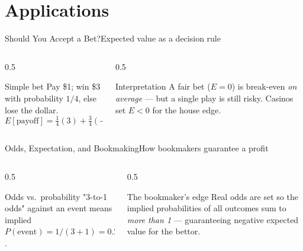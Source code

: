 \documentclass[aspectratio=169,11pt]{beamer}
\begin{document}
\section{Applications}

\begin{frame}{Should You Accept a Bet?}{Expected value as a decision rule}
  \begin{columns}[T]
    \begin{column}{0.5\textwidth}
      \begin{block}{Simple bet}
        \small Pay \$1; win \$3 with probability $1/4$, else lose the
        dollar.
        \[ E[\text{payoff}] = \tfrac14(3) + \tfrac34(-1) = 0 \]
      \end{block}
    \end{column}
    \begin{column}{0.5\textwidth}
      \begin{exampleblock}{Interpretation}
        \small A fair bet ($E=0$) is break-even \emph{on average} — but a
        single play is still risky. Casinos set $E<0$ for the house edge.
      \end{exampleblock}
    \end{column}
  \end{columns}
\end{frame}

\begin{frame}{Odds, Expectation, and Bookmaking}{How bookmakers guarantee a profit}
  \begin{columns}[T]
    \begin{column}{0.5\textwidth}
      \begin{block}{Odds vs.\ probability}
        \small "3-to-1 odds" against an event means implied
        $P(\text{event}) = 1/(3+1) = 0.25$.
      \end{block}
    \end{column}
    \begin{column}{0.5\textwidth}
      \begin{exampleblock}{The bookmaker's edge}
        \small Real odds are set so the implied probabilities of all
        outcomes sum to \emph{more than 1} — guaranteeing negative expected
        value for the bettor.
      \end{exampleblock}
    \end{column}
  \end{columns}
\end{frame}
\end{document}
